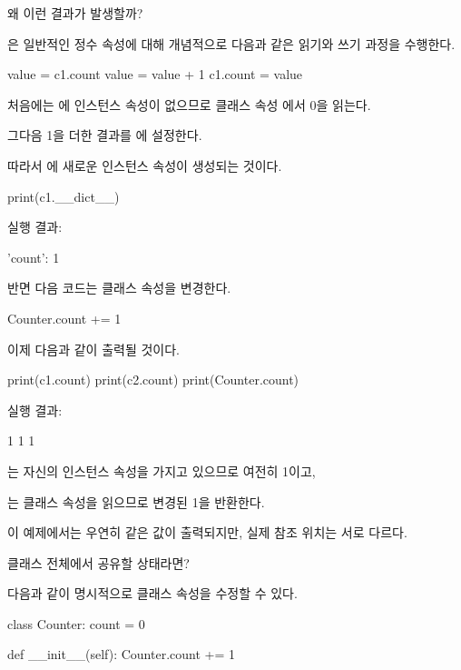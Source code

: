 왜 이런 결과가 발생할까?

은 일반적인 정수 속성에 대해 개념적으로 다음과 같은 읽기와 쓰기 과정을 수행한다.

\begin{dhkcode}
value = c1.count
value = value + 1
c1.count = value
\end{dhkcode}

처음에는 에  인스턴스 속성이 없으므로 클래스 속성 에서 0을 읽는다.

그다음 1을 더한 결과를 에 설정한다.

따라서 에 새로운 인스턴스 속성이 생성되는 것이다.

\begin{dhkcode}
print(c1.__dict__)
\end{dhkcode}

실행 결과:

\begin{dhkzsh}
{'count': 1}
\end{dhkzsh}

반면 다음 코드는 클래스 속성을 변경한다.

\begin{dhkcode}
Counter.count += 1
\end{dhkcode}

이제 다음과 같이 출력될 것이다.

\begin{dhkcode}
print(c1.count)
print(c2.count)
print(Counter.count)
\end{dhkcode}

실행 결과:

\begin{dhkzsh}
1
1
1
\end{dhkzsh}

는 자신의 인스턴스 속성을 가지고 있으므로 여전히 1이고, 

는 클래스 속성을 읽으므로 변경된 1을 반환한다.

이 예제에서는 우연히 같은 값이 출력되지만, 실제 참조 위치는 서로 다르다.

\begin{dhknote}
\begin{dhksmry}[centered]
클래스 전체에서 공유할 상태라면?
\end{dhksmry}
\end{dhknote}

다음과 같이 명시적으로 클래스 속성을 수정할 수 있다.

\begin{dhkcode}
class Counter:
    count = 0

    def __init__(self):
        Counter.count += 1
\end{dhkcode}

